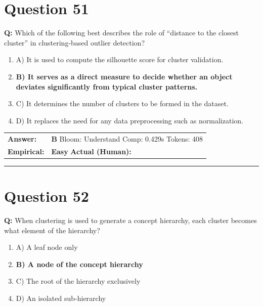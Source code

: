 \documentclass[9pt]{article}
\begin{document}
\section*{Question 51}

\textbf{Q:} Which of the following best describes the role of “distance to the closest cluster” in clustering‑based outlier detection?

\begin{enumerate}[label=\textbf{\alph{*})}, nosep]
    \item A) It is used to compute the silhouette score for cluster validation.
    \item \textbf{B) It serves as a direct measure to decide whether an object deviates significantly from typical cluster patterns.} %
    \item C) It determines the number of clusters to be formed in the dataset.
    \item D) It replaces the need for any data preprocessing such as normalization.

\end{enumerate}

\begin{tabular}{@{}l p{10.5cm}@{}}
\textbf{Answer:} & \textbf{B} \hspace{1em} Bloom: Understand \hspace{1em} Comp: 0.429s \hspace{1em} Tokens: 408 \\
\textbf{Empirical:} & \textbf{Easy} \hspace{1em} \textbf{Actual (Human):} \underline{\hspace{5cm}}
\end{tabular}

\vspace{0.2cm}
\rule{\textwidth}{0.4pt}
\vspace{0.2cm}


\section*{Question 52}

\textbf{Q:} When clustering is used to generate a concept hierarchy, each cluster becomes what element of the hierarchy?

\begin{enumerate}[label=\textbf{\alph{*})}, nosep]
    \item A) A leaf node only
    \item \textbf{B) A node of the concept hierarchy} %
    \item C) The root of the hierarchy exclusively
    \item D) An isolated sub‑hierarchy

\end{enumerate}
\end{document}
